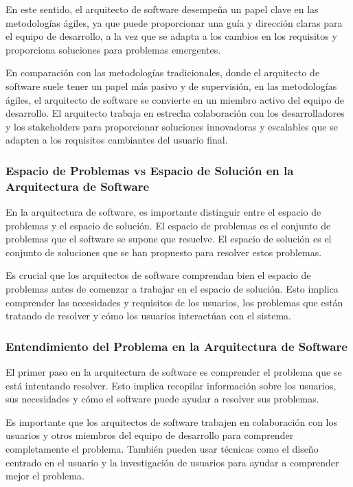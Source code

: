 \documentclass[executivepaper]{article}
\begin{document}
En este sentido, el arquitecto de software desempeña un papel clave en las metodologías ágiles, ya que puede proporcionar una guía y dirección claras para el equipo de desarrollo, a la vez que se adapta a los cambios en los requisitos y proporciona soluciones para problemas emergentes.

En comparación con las metodologías tradicionales, donde el arquitecto de software suele tener un papel más pasivo y de supervisión, en las metodologías ágiles, el arquitecto de software se convierte en un miembro activo del equipo de desarrollo. El arquitecto trabaja en estrecha colaboración con los desarrolladores y los stakeholders para proporcionar soluciones innovadoras y escalables que se adapten a los requisitos cambiantes del usuario final.

\subsubsection*{Espacio de Problemas vs Espacio de Solución en la Arquitectura de Software}

En la arquitectura de software, es importante distinguir entre el espacio de problemas y el espacio de solución. El espacio de problemas es el conjunto de problemas que el software se supone que resuelve. El espacio de solución es el conjunto de soluciones que se han propuesto para resolver estos problemas.

Es crucial que los arquitectos de software comprendan bien el espacio de problemas antes de comenzar a trabajar en el espacio de solución. Esto implica comprender las necesidades y requisitos de los usuarios, los problemas que están tratando de resolver y cómo los usuarios interactúan con el sistema.

\subsubsection*{Entendimiento del Problema en la Arquitectura de Software}

El primer paso en la arquitectura de software es comprender el problema que se está intentando resolver. Esto implica recopilar información sobre los usuarios, sus necesidades y cómo el software puede ayudar a resolver sus problemas.

Es importante que los arquitectos de software trabajen en colaboración con los usuarios y otros miembros del equipo de desarrollo para comprender completamente el problema. También pueden usar técnicas como el diseño centrado en el usuario y la investigación de usuarios para ayudar a comprender mejor el problema.
\end{document}
